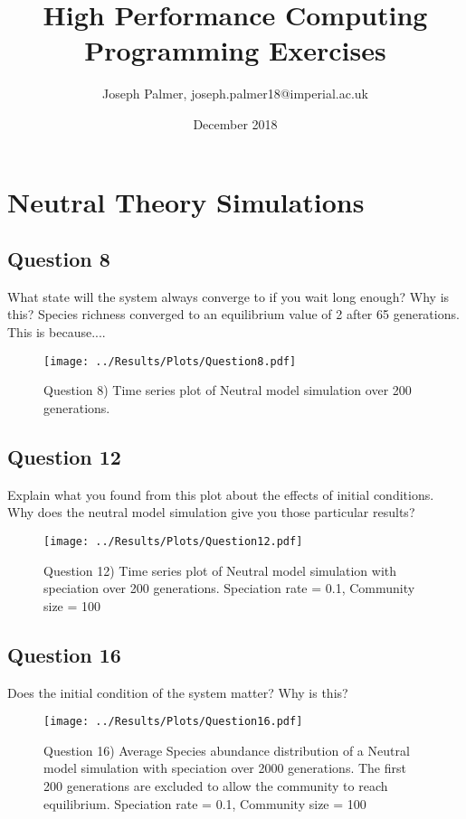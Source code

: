 \documentclass[12pt]{article}
\title{High Performance Computing Programming Exercises}
\author{Joseph Palmer, joseph.palmer18@imperial.ac.uk}
\date{December 2018}
\begin{document}
  \maketitle
  \tableofcontents
  \newpage
  \section{Neutral Theory Simulations}
    \subsection{Question 8}
    What state will the system always converge to if you wait long enough? Why is this?
    Species richness converged to an equilibrium value of 2 after 65 generations. This is because....
     
    \begin{figure}[H]
    	\centering
    	\texttt{[image: ../Results/Plots/Question8.pdf]}
    	\caption{Question 8) Time series plot of Neutral model simulation over 200 generations.}
    \end{figure}

	\subsection{Question 12}
	Explain what you found from this plot about the effects of initial conditions. Why does the neutral model simulation give you those particular results?

	\begin{figure}[H]
		\centering
		\texttt{[image: ../Results/Plots/Question12.pdf]}
		\caption{Question 12) Time series plot of Neutral model simulation with speciation over 200 generations. Speciation rate = 0.1, Community size = 100}
	\end{figure}

	\subsection{Question 16}
	Does the initial condition of the system matter? Why is this?
	\begin{figure}[H]
		\centering
		\texttt{[image: ../Results/Plots/Question16.pdf]}
		\caption{Question 16) Average Species abundance distribution of a Neutral model simulation with speciation over 2000 generations. The first 200 generations are excluded to allow the community to reach equilibrium. Speciation rate = 0.1, Community size = 100}
	\end{figure}
    
\end{document}
